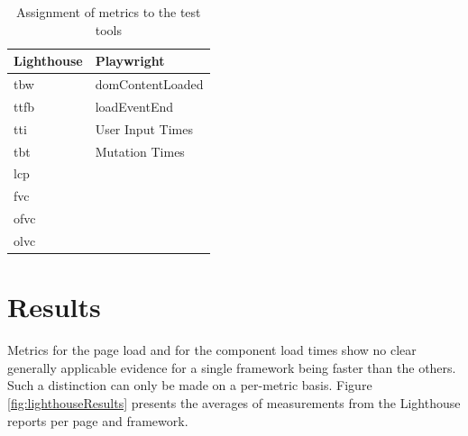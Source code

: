 \documentclass[a4paper, 12pt]{article}
\begin{document}
\begin{table}[h]
  \begin{center}
    \begin{tabular}{|l|l|}
      \hline
      \textbf{Lighthouse} & \textbf{Playwright} \\ \hline
      \acrfull{tbw}       & domContentLoaded    \\ \hline
      \acrfull{ttfb}      & loadEventEnd        \\ \hline
      \acrfull{tti}       & User Input Times    \\ \hline
      \acrfull{tbt}       & Mutation Times      \\ \hline
      \acrfull{lcp}       &                     \\ \hline
      \acrfull{fvc}       &                     \\ \hline
      \acrfull{ofvc}      &                     \\ \hline
      \acrfull{olvc}      &                     \\ \hline
    \end{tabular}
  \end{center}
  \caption{Assignment of metrics to the test tools}
  \label{tab:metricassignment}
\end{table}

\section{Results}

Metrics for the page load and for the component load times show no clear generally applicable evidence for a single framework being faster than the others.
Such a distinction can only be made on a per-metric basis.
Figure \ref{fig:lighthouseResults} presents the averages of measurements from the Lighthouse reports per page and framework.
\\
\end{document}
